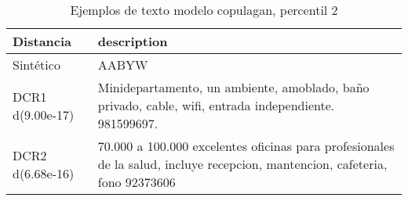\begin{table}[H]
\centering
\fontsize{10}{14}\selectfont
\caption{Ejemplos de texto modelo copulagan, percentil 2}
\label{table-example-economicos-b-2-copulagan-2p-text}
\begin{tabular}{|l|m{35em}|}
\hline
\rowcolor[gray]{0.8}
Distancia & description \\
\hline Sintético & AABYW \\
\hline DCR1 d(9.00e-17) & Minidepartamento, un ambiente, amoblado, ba\~no privado, cable, wifi, entrada independiente. 981599697. \\
\hline DCR2 d(6.68e-16) & 70.000 a 100.000 excelentes oficinas para profesionales de la salud, incluye recepcion, mantencion, cafeteria, fono 92373606 \\
\hline
\end{tabular}
\end{table}
